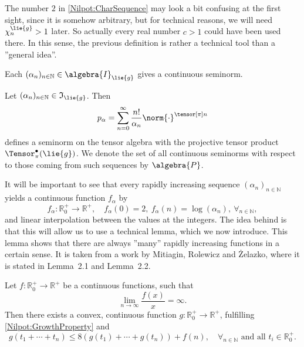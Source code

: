 \begin{remark}
	The number $2$ in \eqref{Nilpot:CharSequence} may look a bit confusing at 
	the first sight, since it is somehow arbitrary, but for technical reasons, 
	we will need $\chi^{\lie{g}}_n > 1$ later. 
	So actually every real number $c > 1$ 
	could have been used there. In this sense, the previous definition is rather 
	a technical tool than a ''general idea''.
\end{remark}
Each $(\alpha_n)_{n \in \mathbb{N}} \in \algebra{I}_{\lie{g}}$ gives a continuous 
seminorm.
\begin{definition}
	\label{Def:AdaptedBanachSeminorms}
	Let $(\alpha_n)_{n \in \mathbb{N}} \in \mathfrak{I}_{\lie{g}}$. Then
	\begin{equation*}
		p_{\alpha}
		=
		\sum\limits_{n = 0}^{\infty}
		\frac{n!}{\alpha_n}
		\norm{\cdot}^{\tensor[\pi] n}
	\end{equation*}
	defines a seminorm on the tensor algebra with the projective tensor product 
	$\Tensor_{\pi}^{\bullet}(\lie{g})$. We denote the set of all continuous 
	seminorms with respect to those	coming from such sequences by $\algebra{P}$.
\end{definition}
It will be important to see that every rapidly increasing sequence 
$(\alpha_n)_{n \in \mathbb{N}}$ yields a continuous function $f_{\alpha}$ by
\begin{equation}
	\label{Nilpot:IncreasingFunction}
	f_{\alpha}
	\colon
	\mathbb{R}_0^+
	\longrightarrow
	\mathbb{R}^+
	, \quad
	f_{\alpha}(0)
	=
	2
	,\
	f_{\alpha}(n)
	=
	\log \left( \alpha_n \right)
	,\
	\forall_{n \in \mathbb{N}},
\end{equation}
and linear interpolation between the values at the integers. The idea behind is 
that this will allow us to use a technical lemma, which we now introduce. This 
lemma shows that there are always ''many'' rapidly increasing functions in a 
certain sense. It is taken from a work \cite{mitiagin.rolewicz.zelazko:1962a} by 
Mitiagin, Rolewicz and \.{Z}elazko, where it is stated in Lemma~2.1 and Lemma~2.2.
\begin{lemma}
	\label{Nilpot:Lemma:MRZGrothLemma}
	Let $f\colon \mathbb{R}_0^+ \longrightarrow \mathbb{R}^+$ be a continuous 
	functions, such that
	\begin{equation}
		\label{Nilpot:GrowthProperty}
		\lim_{n \longrightarrow \infty}
		\frac{f(x)}{x}
		=
		\infty.
	\end{equation}
	Then there exists a convex, continuous function $g \colon \mathbb{R}_0^+ 
	\longrightarrow \mathbb{R}^+$, fulfilling \eqref{Nilpot:GrowthProperty} and
	\begin{equation}
		\label{Nilpot:SplittingProperty}
		g \left(
			t_1 + \cdots + t_n
		\right)
		\leq
		8 \left(
			g \left( t_1 \right)
			+ \cdots +
			g \left( t_n \right)
		\right)
		+
		f(n)
		, \quad
		\forall_{n \in \mathbb{N}}
		\text{ and all }
		t_i \in \mathbb{R}_0^+.
	\end{equation}
\end{lemma}
